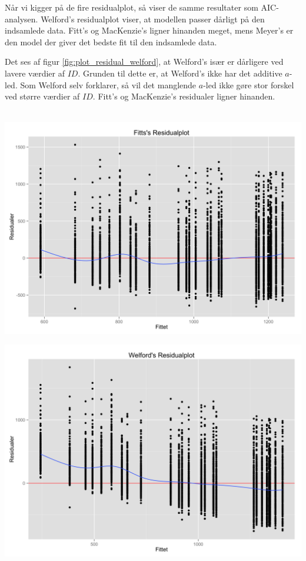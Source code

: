 Når vi kigger på de fire residualplot, så viser de samme resultater som AIC-analysen. Welford's residualplot viser, at modellen passer dårligt på den indsamlede data. Fitt's og MacKenzie's ligner hinanden meget, mens Meyer's er den model der giver det bedste fit til den indsamlede data.

Det ses af figur \ref{fig:plot_residual_welford}, at Welford's især er dårligere ved lavere værdier af $ID$. Grunden til dette er, at Welford's ikke har det additive $a$-led. Som Welford \cite{welford1968} selv forklarer, så vil det manglende $a$-led ikke gøre stor forskel ved større værdier af $ID$. Fitt's og MacKenzie's residualer ligner hinanden.\\\\
\begin{minipage}{\linewidth}
	\begin{minipage}{.5\linewidth}
		\includegraphics[width=0.8\linewidth]{images/plots/plot_residual_fitt}
		\label{fig:plot_residual_fitt}
	\end{minipage}
	\begin{minipage}{.5\linewidth}
		\includegraphics[width=0.8\linewidth]{images/plots/plot_residual_welford}

\end{minipage}
\end{minipage}
